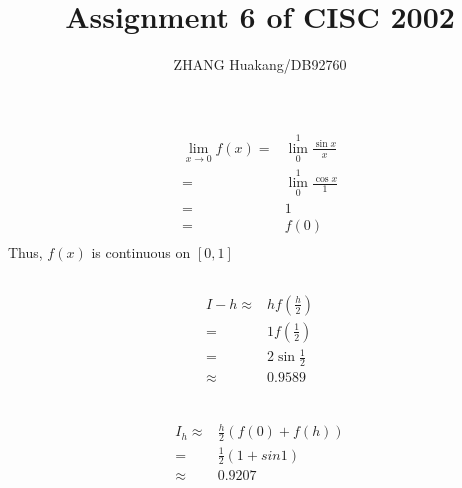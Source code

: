 \documentclass{article}
\title{Assignment 6 of CISC 2002}
\author{ZHANG Huakang/DB92760}
\begin{document}
    \maketitle
    \section{}
        \paragraph{}
        \begin{equation*}
            \begin{split}
                \lim_{x\rightarrow 0}f(x)=&\lim_0^1 \frac{\sin x}{x}\\
                    =&\lim_0^1 \frac{\cos x}{1}\\
                    =&1\\
                    =&f(0)\\
            \end{split}
        \end{equation*}
        Thus, $f(x)$ is continuous on $[0,1]$
        \subsection{}
            \paragraph{}
            \begin{equation*}
                \begin{split}
                    I-h\approx&hf(\frac{h}{2})\\
                        =&1f(\frac{1}{2})\\
                        =&2\sin \frac{1}{2}\\
                        \approx&0.9589\\
                \end{split}
            \end{equation*}
        \subsection{}
            \paragraph{}
            \begin{equation*}
                \begin{split}
                    I_h\approx &\frac{h}{2}(f(0)+f(h))\\
                        =&\frac{1}{2}(1+sin 1)\\
                        \approx&0.9207\\
                \end{split}
            \end{equation*}
\end{document}
